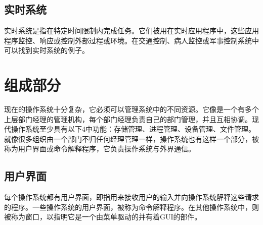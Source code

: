 \subsection{实时系统}
实时系统是指在特定时间限制内完成任务。它们被用在实时应用程序中，这些应用程序监控、响应或控制外部过程或环境。在交通控制、病人监控或军事控制系统中可以找到实时系统的例子。
\section{组成部分}
现在的操作系统十分复杂，它必须可以管理系统中的不同资源。它像是一个有多个上层部门经理的管理机构，每个部门经理负责自己的部门管理，并且互相协调。现代操作系统至少具有以下4中功能：存储管理、进程管理、设备管理、文件管理。就像很多组织由一个部门不归任何经理管理一样，操作系统也有这样一个部分，被称为用户界面或命令解释程序，它负责操作系统与外界通信。
\subsection{用户界面}
每个操作系统都有用户界面，即指用来接收用户的输入并向操作系统解释这些请求的程序。一些操作系统的用户界面，被称为命令解释程序。在其他操作系统中，则被称为窗口，以指明它是一个由菜单驱动的并有着GUI的部件。
